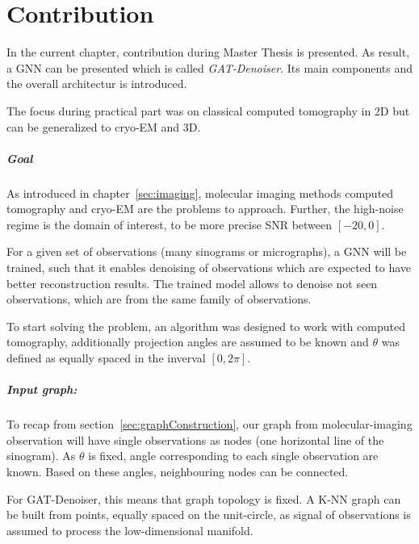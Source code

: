 \chapter{Contribution}
\label{sec:contribution}

In the current chapter, contribution during Master Thesis is presented.
As result, a GNN can be presented which is called \textit{GAT-Denoiser}.
Its main components and the overall architectur is introduced.

The focus during practical part was on classical computed tomography in 2D but
can be generalized to cryo-EM and 3D.

\paragraph{Goal}
As introduced in chapter~\ref{sec:imaging}, molecular imaging methods computed tomography and cryo-EM are the problems
to approach. Further, the high-noise regime is the domain of interest, to be more precise SNR between $[-20, 0]$.

For a given set of observations (many sinograms or micrographs), a GNN will be trained, such that
it enables denoising of observations which are expected to have better reconstruction results.
The trained model allows to denoise not seen observations, which are from the same family of observations.


\begin{tcolorbox}[colback=red!5!white,colframe=red!75!black]
  To start solving the problem, an algorithm was designed to work with computed tomography, additionally
  projection angles are assumed to be known and $\theta$ was defined as equally spaced 
  in the inverval $[0, 2 \pi]$. \\
\end{tcolorbox}

\paragraph{Input graph:}
To recap from section~\ref{sec:graphConstruction}, our graph from molecular-imaging observation
will have single observations as nodes (one horizontal line of the sinogram). 
As $\theta$ is fixed, angle corresponding to each single observation are known. 
Based on these angles, neighbouring nodes can be connected.

\begin{tcolorbox}[colback=red!5!white,colframe=red!75!black]
  For GAT-Denoiser, this means that graph topology is fixed. 
  A K-NN graph can be built from points, equally spaced on the unit-circle,
  as signal of observations is assumed to process the low-dimensional manifold.
\end{tcolorbox}


